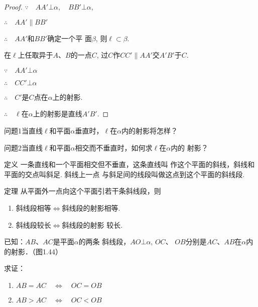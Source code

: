 \begin{proof}
  $\because\quad AA'\bot \alpha,\quad BB'\bot\alpha$,

$\therefore\quad AA'\parallel BB'$

$\therefore\quad AA'$和$BB'$确定一个平
面$\beta$, 则$\ell\subset\beta$.

在$\ell$上任取异于$A$、$B$的一点$C$, 过$C$作$CC'\parallel AA'$交$A'B'$于$C$.

$\because\quad AA'\bot \alpha$

$\therefore \quad CC'\bot\alpha$

$\therefore\quad  C'$是$C$点在$\alpha$上的射影. 

$\therefore\quad \ell$在$\alpha$上的射影是直线$A'B'$.
\end{proof}

\begin{blk}
  {问题1}当直线$\ell$和平面$\alpha$垂直时，$\ell$在$\alpha$内的射影将怎样？
\end{blk}


\begin{blk}
  {问题2}当直线$\ell$和平面$\alpha$相交而不垂直时，如何求$\ell$在$\alpha$内的
射影？
\end{blk}

\begin{blk}
  {定义} 一条直线和一个平面相交但不垂直，这条直线叫
作这个平面的斜线，斜线和平面的交点叫斜足. 斜线上一点
与斜足间的线段叫做这点到这个平面的斜线段. 
\end{blk}

\begin{blk}
{定理} 从平面外一点向这个平面引若干条斜线段，则
\begin{enumerate}
  \item 斜线段相等$\Longleftrightarrow$斜线段的射影相等. 
  \item 斜线段较长$\Longleftrightarrow$斜线段的射影
较长. 
\end{enumerate}
\end{blk}


\begin{example}
  已知：$AB$、$AC$是平面$\alpha$的两条
斜线段，$AO\bot\alpha$, $OC$、
$OB$分别是$AC$、$AB$在$\alpha$内的射影．（图1.44）

求证：
\begin{enumerate}
  \item $AB=AC\quad \Longleftrightarrow \quad OC=OB$
  \item $AB>AC\quad \Longleftrightarrow \quad OC<OB$
\end{enumerate}
\end{example}

